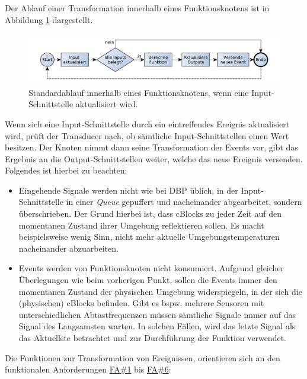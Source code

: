  Der Ablauf einer Transformation innerhalb eines Funktionsknotens ist in Abbildung \ref{fig:seqfunktionsblock} dargestellt.
 \begin{figure}[h]
  \centering
  \includegraphics[width=1\textwidth]{bilder/chapter4/chapter4_2/funktionsblockablauf.pdf}
  \caption{Standardablauf innerhalb eines Funktionsknotens, wenn eine Input-Schnittstelle aktualisiert wird.}
  \label{fig:seqfunktionsblock}
\end{figure}
Wenn sich eine Input-Schnittstelle durch ein eintreffendes Ereignis aktualisiert wird, prüft der Transducer nach, ob sämtliche Input-Schnittstellen einen Wert besitzen. Der Knoten nimmt dann seine Transformation der Events vor, gibt das Ergebnis an die Output-Schnittstellen weiter, welche das neue Ereignis versenden. Folgendes ist hierbei zu beachten: 
\begin{itemize}
    \item Eingehende Signale werden nicht wie bei \ac{DBP} üblich, in der Input-Schnittstelle in einer \textit{Queue} gepuffert und nacheinander abgearbeitet, sondern überschrieben. Der Grund hierbei ist, dass cBlocks zu jeder Zeit auf den momentanen Zustand ihrer Umgebung reflektieren sollen. Es macht beispielsweise wenig Sinn, nicht mehr aktuelle Umgebungstemperaturen nacheinander abzuarbeiten.
    \item Events werden von Funktionsknoten nicht konsumiert. Aufgrund gleicher Überlegungen wie beim vorherigen Punkt, sollen die Events immer den momentanen Zustand der physischen Umgebung widerspiegeln, in der sich die (physischen) cBlocks befinden. Gibt es bspw. mehrere Sensoren mit unterschiedlichen Abtastfrequenzen müssen sämtliche Signale immer auf das Signal des Langsamsten warten. In solchen Fällen, wird das letzte Signal als das Aktuellste betrachtet und zur Durchführung der Funktion verwendet.
\end{itemize}
 Die Funktionen zur Transformation von Ereignissen, orientieren sich an den funktionalen Anforderungen \hyperref[tab:fanf]{FA\#1}  bis  \hyperref[tab:fanf]{FA\#6}:
